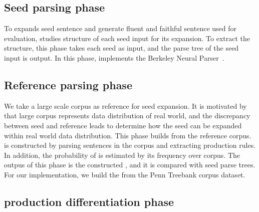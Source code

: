 \subsection{Seed parsing phase}
To expands seed sentence and generate fluent and faithful sentence
used for evaluation, \Model studies structure of each seed input for
its expansion. To extract the structure, this phase takes each seed as
input, and the parse tree of the seed input is output.  In this phase,
\Model implements the Berkeley Neural
Parser~\cite{kitaev2018seedparser,kitaev2019seedparser}.

\subsection{Reference parsing phase}
We take a large scale corpus as reference for seed expansion. It is
motivated by that large corpus represents data distribution of real
world, and the discrepancy between seed and reference leads to
determine how the seed can be expanded within real world data
distribution. This phase builds \pcfg from the reference corpus. \cfg
is constructed by parsing sentences in the corpus and extracting
production rules. In addition, the probability of \cfg is estimated by
its frequency over corpus. The outpus of this phase is the constructed
\pcfg, and it is compared with seed parse trees. For our
implementation, we build the \pcfg from the Penn Treebank corpus dataset.

\subsection{production differentiation phase}


